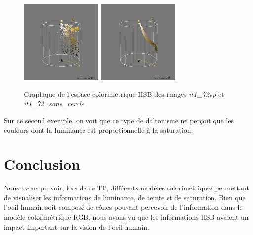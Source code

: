\documentclass[a4paper,10pt]{article}
\begin{document}
\begin{figure}[!h]
 \begin{center}
 \includegraphics[width=4cm]{resultat/compare2_1.png}
 \includegraphics[width=4cm]{resultat/compare2_2.png}
 \caption{Graphique de l'espace colorimétrique HSB des images \textit{it1\_72pp} et \textit{it1\_72\_sans\_cercle}}
 \end{center}
\end{figure}

Sur ce second exemple, on voit que ce type de daltonisme ne perçoit que les couleurs dont la luminance est proportionnelle à 
la saturation.

\section{Conclusion}
Nous avons pu voir, lors de ce TP, différents modèles colorimétriques permettant de visualiser les informations de luminance, de 
teinte et de saturation. Bien que l'oeil humain soit composé de cônes pouvant percevoir de l'information dans le modèle
colorimétrique RGB, nous avons vu que les informations HSB avaient un impact important sur la vision de l'oeil humain.

\newpage
\end{document}
